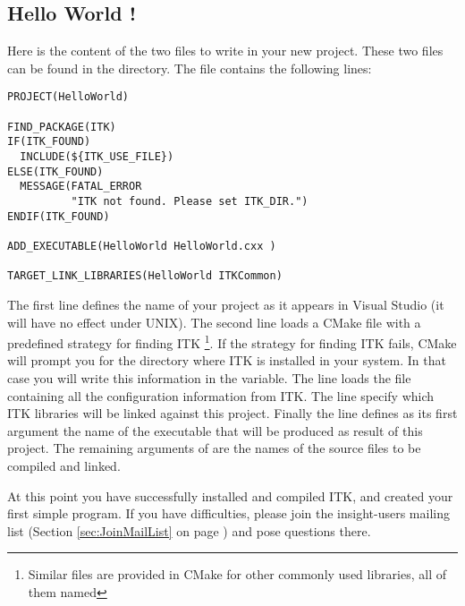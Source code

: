 \subsection{Hello World !}
\label{sec:HelloWorldITK}


Here is the content of the two files to write in your new project. These two
files can be found in the  directory. The
 file contains the following lines:

\begin{verbatim}
PROJECT(HelloWorld)

FIND_PACKAGE(ITK)
IF(ITK_FOUND)
  INCLUDE(${ITK_USE_FILE})
ELSE(ITK_FOUND)
  MESSAGE(FATAL_ERROR
          "ITK not found. Please set ITK_DIR.")
ENDIF(ITK_FOUND)

ADD_EXECUTABLE(HelloWorld HelloWorld.cxx )

TARGET_LINK_LIBRARIES(HelloWorld ITKCommon)
\end{verbatim}

The first line defines the name of your project as it appears in Visual
Studio (it will have no effect under UNIX). The second line loads a CMake
file with a predefined strategy for finding ITK \footnote{Similar files are
provided in CMake for other commonly used libraries, all of them named
}. If the strategy for finding ITK fails, CMake will prompt
you for the directory where ITK is installed in your system. In that case you
will write this information in the  variable. The line  loads the  file containing
all the configuration information from ITK. The  line
specify which ITK libraries will be linked against this project. Finally the
line
 defines as its first argument the name of the executable
that will be produced as result of this project. The remaining arguments of
 are the names of the source files to be compiled and linked.



At this point you have successfully installed and compiled ITK, and created
your first simple program. If you have difficulties, please join the
insight-users mailing list (Section \ref{sec:JoinMailList} on page
\pageref{sec:JoinMailList}) and pose questions there.
